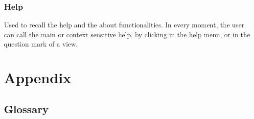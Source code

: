 \documentclass[10pt,a4paper,twoside,titlepage]{article}
\begin{document}
\subsubsection{Help}
\label{subsubsec:Help} 
Used to recall the help and the about functionalities. In every moment, the user can call the main or context sensitive help, by clicking in the help menu, or in the question mark of a view.





\section{Appendix}
\label{sec:Appendix}


\subsection{Glossary}
\label{subsec:Glossary}
\end{document}
